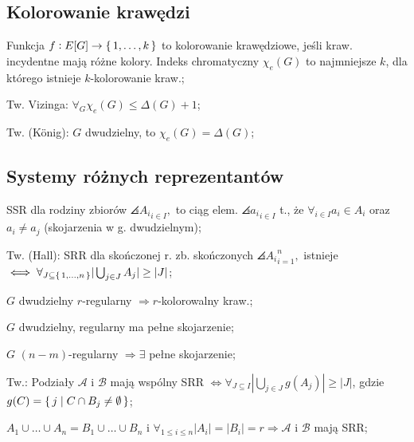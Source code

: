 \subsection{Kolorowanie krawędzi}

Funkcja $f: E[G] \rightarrow \set{1, \dots, k}$ to kolorowanie krawędziowe,
  jeśli kraw. incydentne mają różne kolory. Indeks chromatyczny $\chi_e(G)$ to
  najmniejsze $k$, dla którego istnieje $k$-kolorowanie kraw.;

Tw. Vizinga: $\forall_G \chi_e(G) \leq \Delta(G) +1$;

Tw. (K{\"o}nig): $G$ dwudzielny, to $\chi_e(G) = \Delta(G)$;

\subsection{Systemy różnych reprezentantów}

SSR dla rodziny zbiorów $\angles{A_i}_{i\in I},$ to ciąg elem.
  $\angles{a_i}_{i\in I}$ t., że
  $\forall_{i\in I} a_i \in A_i$ oraz $a_i \neq a_j$
  (skojarzenia w g. dwudzielnym);

Tw. (Hall): SRR dla skończonej r. zb. skończonych $\angles{A_i}_{i=1}^n,$
  istnieje
  $\iff \forall_{J\subseteq\set{1,\dots,n}} |\bigcup_{j\in J}A_j| \geq |J|$;

$G$ dwudzielny $r$-regularny $\Rightarrow r$-kolorowalny kraw.;

$G$ dwudzielny, regularny ma pełne skojarzenie;

$G$ $(n-m)$-regularny $\Rightarrow \exists$ pełne skojarzenie;

Tw.: Podziały $\mathcal{A}$ i $\mathcal{B}$ mają wspólny SRR $\Leftrightarrow
  \forall_{J\subseteq I} |\bigcup_{j\in J}g(A_j)| \geq |J|$, gdzie
  $g(C) = \set{j | C \cap B_j \neq \emptyset}$;

$A_1 \cup \dots \cup A_n = B_1 \cup \dots \cup B_n$ i
  $\forall_{1 \leq i \leq n}|A_i| = |B_i| =r \Rightarrow \mathcal{A}$ i
  $\mathcal{B}$ mają SRR;
